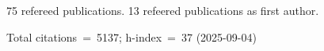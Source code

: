 75 refereed publications. 13 refeered publications as first author.

Total citations~=~5137; h-index~=~37 (2025-09-04)